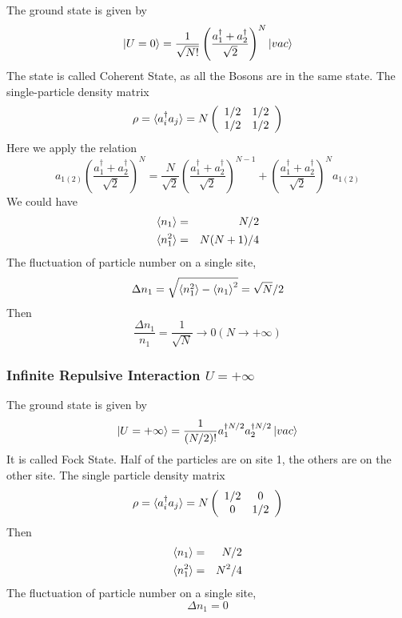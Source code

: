 The ground state is given by
\begin{equation}
\ket{U=0} = \frac{1}{\sqrt{N!}}\left(\frac{a_1^\dag+a_2^\dag}{\sqrt{2}}\right)^N \ket{vac}
\end{equation}
The state is called Coherent State, as all the Bosons are in the same state. The single-particle density matrix
\begin{equation}
\rho=\braket{a_i^\dag a_j} = N\left(\begin{array}{cc}
1/2 & 1/2\\
1/2 & 1/2
\end{array}\right)
\end{equation}
Here we apply the relation
\begin{equation}
a_{1(2)} \left(\frac{a_1^\dag+a_2^\dag}{\sqrt{2}}\right)^N = \frac{N}{\sqrt{2}}\left(\frac{a_1^\dag+a_2^\dag}{\sqrt{2}}\right)^{N-1}+\left(\frac{a_1^\dag+a_2^\dag}{\sqrt{2}}\right)^N a_{1(2)}
\end{equation}
We could have
\begin{eqnarray}
\braket{n_1} &=& N/2\\
\braket{n_1^2} &=& N(N+1)/4
\end{eqnarray}
The fluctuation of particle number on a single site, 
\begin{equation}
\Delta n_1 = \sqrt{\braket{n_1^2}-\braket{n_1}^2} = \sqrt{N}/2
\end{equation}
Then
\begin{equation}
\frac{\Delta n_1}{n_1} = \frac{1}{\sqrt{N}} \rightarrow 0 (N\rightarrow +\infty)
\end{equation}

\subsubsection{Infinite Repulsive Interaction $U=+\infty$}

The ground state is given by
\begin{equation}
\ket{U = +\infty} = \frac{1}{(N/2)!}a_1^{\dag N/2}a_2^{\dag N/2}\ket{vac}
\end{equation}
It is called Fock State. Half of the particles are on site 1, the others are on the other site. The single particle density matrix
\begin{equation}
\rho=\braket{a_i^\dag a_j} = N\left(\begin{array}{cc}
1/2 & 0\\
0 & 1/2
\end{array}\right)
\end{equation}
Then
\begin{eqnarray}
\braket{n_1} &=& N/2\\
\braket{n_1^2} &=& N^2/4
\end{eqnarray}
The fluctuation of particle number on a single site,
\begin{equation}
\Delta n_1 = 0
\end{equation}

